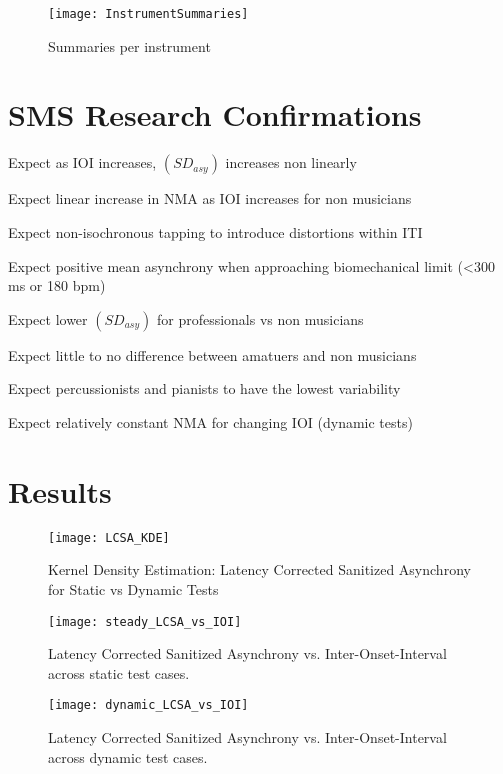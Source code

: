 \begin{figure}[H]
    \centering
    \texttt{[image: InstrumentSummaries]}
    \caption{Summaries per instrument}
    \label{fig:InstrumentSummaries}
\end{figure}

\section{SMS Research Confirmations}
Expect as IOI increases, $(SD_{asy})$ increases non linearly

Expect linear increase in NMA as IOI increases for non musicians

Expect non-isochronous tapping to introduce distortions within ITI

Expect positive mean asynchrony when approaching biomechanical limit (<300 ms or 180 bpm)

Expect lower $(SD_{asy})$ for professionals vs non musicians

Expect little to no difference between amatuers and non musicians

Expect percussionists and pianists to have the lowest variability

Expect relatively constant NMA for changing IOI (dynamic tests)


\section{Results}

\begin{figure}[H]
    \centering
    \texttt{[image: LCSA\_KDE]}
    \caption{Kernel Density Estimation: Latency Corrected Sanitized Asynchrony for Static vs Dynamic Tests}
    \label{fig:InstrumentSummaries}
\end{figure}

\begin{figure}[h]
    \centering
    \texttt{[image: steady\_LCSA\_vs\_IOI]}
    \caption{Latency Corrected Sanitized Asynchrony vs. Inter-Onset-Interval across static test cases.}
    \label{fig:sLCSAvIOI}
\end{figure}

\begin{figure}[H]
    \centering
    \texttt{[image: dynamic\_LCSA\_vs\_IOI]}
    \caption{Latency Corrected Sanitized Asynchrony vs. Inter-Onset-Interval across dynamic test cases.}
    \label{fig:dLCSAvIOI}
\end{figure}

